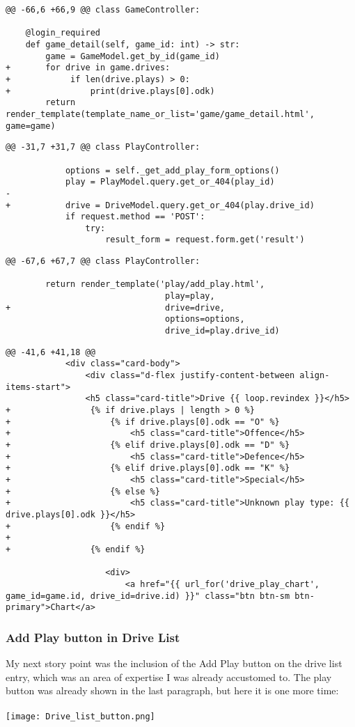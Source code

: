 \begin{verbatim}
@@ -66,6 +66,9 @@ class GameController:
	
	@login_required
	def game_detail(self, game_id: int) -> str:
		game = GameModel.get_by_id(game_id)
+       for drive in game.drives:
+            if len(drive.plays) > 0:
+                print(drive.plays[0].odk)
		return render_template(template_name_or_list='game/game_detail.html', game=game)
\end{verbatim}

\begin{verbatim}
@@ -31,7 +31,7 @@ class PlayController:
	
			options = self._get_add_play_form_options()
			play = PlayModel.query.get_or_404(play_id)
-
+       	drive = DriveModel.query.get_or_404(play.drive_id)
			if request.method == 'POST':
				try:
					result_form = request.form.get('result')
\end{verbatim}

\begin{verbatim}
@@ -67,6 +67,7 @@ class PlayController:

		return render_template('play/add_play.html',
								play=play,
+                               drive=drive,
								options=options,
								drive_id=play.drive_id)	
\end{verbatim}	

\begin{verbatim}
@@ -41,6 +41,18 @@
			<div class="card-body">
				<div class="d-flex justify-content-between align-items-start">
				<h5 class="card-title">Drive {{ loop.revindex }}</h5>
+                {% if drive.plays | length > 0 %}
+                    {% if drive.plays[0].odk == "O" %}
+                        <h5 class="card-title">Offence</h5>
+                    {% elif drive.plays[0].odk == "D" %}
+                        <h5 class="card-title">Defence</h5>
+                    {% elif drive.plays[0].odk == "K" %}
+                        <h5 class="card-title">Special</h5>
+                    {% else %}
+                        <h5 class="card-title">Unknown play type: {{ drive.plays[0].odk }}</h5>
+                    {% endif %}
+
+                {% endif %}

					<div>
						<a href="{{ url_for('drive_play_chart', game_id=game.id, drive_id=drive.id) }}" class="btn btn-sm btn-primary">Chart</a>	
\end{verbatim}

\subsubsection{Add Play button in Drive List}
My next story point was the inclusion of the Add Play button on the drive list entry, which was an area of expertise I was already accustomed to. The play button was already shown in the last paragraph, but here it is one more time:\\ \\
\texttt{[image: Drive\_list\_button.png]} \\


